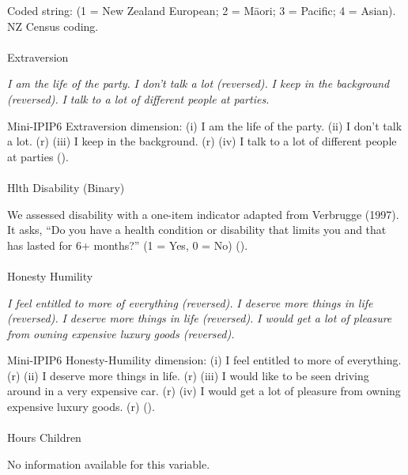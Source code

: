 \documentclass[
  single column]{article}
\makeatletter
\let\oldparagraph\paragraph
\renewcommand{\paragraph}{
    \@ifstar
      \xxxParagraphStar
      \xxxParagraphNoStar
  }
\newcommand{\xxxParagraphStar}[1]{\oldparagraph*{#1}\mbox{}}
\newcommand{\xxxParagraphNoStar}[1]{\oldparagraph{#1}\mbox{}}
\makeatother
\begin{document}
Coded string: (1 = New Zealand European; 2 = Māori; 3 = Pacific; 4 =
Asian). NZ Census coding.

\paragraph{Extraversion}\label{extraversion}

\emph{I am the life of the party.} \emph{I don't talk a lot (reversed).}
\emph{I keep in the background (reversed).} \emph{I talk to a lot of
different people at parties.}

Mini-IPIP6 Extraversion dimension: (i) I am the life of the party. (ii)
I don't talk a lot. (r) (iii) I keep in the background. (r) (iv) I talk
to a lot of different people at parties
().

\paragraph{Hlth Disability (Binary)}\label{hlth-disability-binary}

We assessed disability with a one-item indicator adapted from Verbrugge
(1997). It asks, ``Do you have a health condition or disability that
limits you and that has lasted for 6+ months?'' (1 = Yes, 0 = No)
().

\paragraph{Honesty Humility}\label{honesty-humility}

\emph{I feel entitled to more of everything (reversed).} \emph{I deserve
more things in life (reversed).} \emph{I deserve more things in life
(reversed).} \emph{I would get a lot of pleasure from owning expensive
luxury goods (reversed).}

Mini-IPIP6 Honesty-Humility dimension: (i) I feel entitled to more of
everything. (r) (ii) I deserve more things in life. (r) (iii) I would
like to be seen driving around in a very expensive car. (r) (iv) I would
get a lot of pleasure from owning expensive luxury goods. (r)
().

\paragraph{Hours Children}\label{hours-children}

No information available for this variable.
\end{document}
